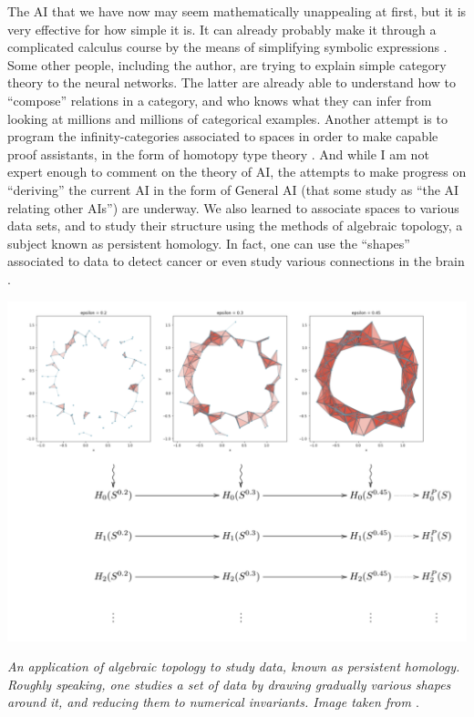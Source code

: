 \documentclass{article}
\begin{document}
The AI that we have now may seem mathematically unappealing at first, but it is very effective for how simple it is. It can already probably make it through a complicated calculus course by the means of simplifying symbolic expressions \cite{LAMPCHART}. Some other people, including the author, are trying to explain simple category theory to the neural networks. The latter are already able to understand how to ``compose'' relations
in a category, and who knows what they can infer from looking at millions and millions of categorical examples.
Another attempt is to program the infinity-categories associated to spaces in order to make capable proof assistants, in the form of homotopy type theory \cite{HOTT}. And while I am not expert enough to comment on the theory of AI, the attempts to make progress on “deriving” the current AI in the form of General AI (that some study as ``the AI relating other AIs'') are underway.
We also learned to associate spaces to various data sets, and to study their structure
using the methods of algebraic topology, a subject known as persistent homology. In
fact, one can use the ``shapes'' associated to data to detect cancer \cite{LAWSON} or
even study various connections in the brain \cite{PETRI}.

\begin{center}
\includegraphics[scale=0.52]{noisy_circle_simplexes_and_persistent_homology.png}

\textit{An application of algebraic topology to study data, known as persistent homology. Roughly speaking, one studies a set of data by drawing gradually various shapes around it, and reducing them to numerical invariants. Image taken from \cite{BUNCH}}.
\end{center}
\end{document}
